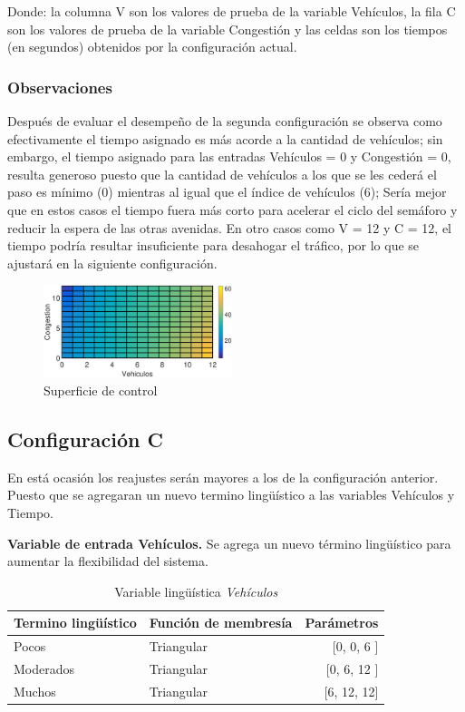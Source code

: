 Donde: la columna V son los valores de prueba de la variable Vehículos, la fila C son los valores de  prueba de la variable Congestión y las celdas son los tiempos (en segundos) obtenidos por la configuración actual.

\subsubsection{Observaciones}
\begin{multicols}{2}
Después de evaluar el desempeño de la segunda configuración se observa como efectivamente el tiempo asignado es más acorde a la cantidad de vehículos; sin embargo, el tiempo asignado para las entradas Vehículos = 0 y Congestión = 0, resulta generoso puesto que la cantidad de vehículos a los que se les cederá el paso es mínimo (0) mientras al igual que el índice de vehículos (6); Sería mejor que en estos casos el tiempo fuera más corto para acelerar el ciclo del semáforo y reducir la espera de las otras avenidas. En otro casos como V = 12 y C = 12, el tiempo podría resultar insuficiente para desahogar el tráfico, por lo que se ajustará en la siguiente configuración.

\begin{figure}[H]
	\includegraphics[width=0.49\textwidth]{Surfaces/Surface2D_B.eps}
	\caption[Superficie de control (configuración \textit{B})]{Superficie de control}
\end{figure}

\end{multicols}


\pagebreak
\subsection{Configuración C}
En está ocasión los reajustes serán mayores a los de la configuración anterior. Puesto que se agregaran un nuevo termino lingüístico a las variables Vehículos y Tiempo.

\textbf{Variable de entrada Vehículos.} Se agrega un nuevo término lingüístico para aumentar la flexibilidad del sistema.

\begin{table}[!h]
	\centering
	\begin{tabular}{llr} \toprule
		Termino lingüístico & Función de membresía & Parámetros \\ \midrule
		Pocos & Triangular & [0, 0, 6 ] \\
		Moderados & Triangular & [0, 6, 12 ] \\
		Muchos & Triangular & [6, 12, 12] \\ \bottomrule
	\end{tabular}
	\caption[Variable lingüística \textit{Vehículos} (configuración \textit{C})]{Variable lingüística \textit{Vehículos}}
\end{table}


